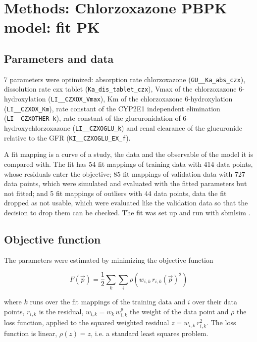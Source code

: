 \section{Methods: Chlorzoxazone PBPK model: fit PK}

\subsection{Parameters and data}

7 parameters were optimized: absorption rate chlorzoxazone (\texttt{GU\_\_Ka\_abs\_czx}), dissolution rate czx tablet (\texttt{Ka\_dis\_tablet\_czx}), Vmax of the chlorzoxazone 6-hydroxylation (\texttt{LI\_\_CZXOX\_Vmax}), Km of the chlorzoxazone 6-hydroxylation (\texttt{LI\_\_CZXOX\_Km}), rate constant of the CYP2E1 independent elimination (\texttt{LI\_\_CZXOTHER\_k}), rate constant of the glucuronidation of 6-hydroxychlorzoxazone (\texttt{LI\_\_CZXOGLU\_k}) and renal clearance of the glucuronide relative to the GFR (\texttt{KI\_\_CZXOGLU\_EX\_f}).

A fit mapping is a curve of a study, the data and the observable of the model it is compared with. The fit has 54 fit mappings of training data with 414 data points, whose residuals enter the objective; 85 fit mappings of validation data with 727 data points, which were simulated and evaluated with the fitted parameters but not fitted; and 5 fit mappings of outliers with 44 data points, data the fit dropped as not usable, which were evaluated like the validation data so that the decision to drop them can be checked. The fit was set up and run with sbmlsim \cite{Koenig2026_sbmlsim}.

\subsection{Objective function}

The parameters were estimated by minimizing the objective function

\begin{equation}
F(\vec{p}) = \frac{1}{2} \sum_{k} \sum_{i} \rho\left(w_{i,k}\, r_{i,k}(\vec{p})^2\right)
\end{equation}

where $k$ runs over the fit mappings of the training data and $i$ over their data points, $r_{i,k}$ is the residual, $w_{i,k} = w_k\, w^{p}_{i,k}$ the weight of the data point and $\rho$ the loss function, applied to the squared weighted residual $z = w_{i,k}\, r_{i,k}^2$. The loss function is linear, $\rho(z) = z$, i.e. a standard least squares problem.

